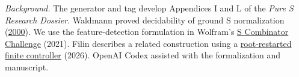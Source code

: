 \par{\small \emph{Background.} The generator and tag develop Appendices I and L of the \emph{Pure S Research Dossier}. Waldmann proved decidability of ground S normalization (\href{https://doi.org/10.1006/inco.2000.2874}{2000}). We use the feature-detection formulation in Wolfram's \href{https://writings.stephenwolfram.com/2021/06/1920-2020-and-a-20000-prize-announcing-the-s-combinator-challenge/}{S Combinator Challenge} (2021). Filin describes a related construction using a \href{https://cinematicstrawberry.com/00110000/articles/scombinator.html}{root-restarted finite controller} (2026). OpenAI Codex assisted with the formalization and manuscript.}
